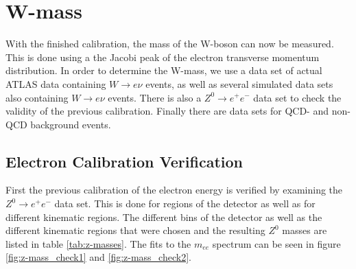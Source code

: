 \section{W-mass}
\label{sec:w-mass}
With the finished calibration, the mass of the W-boson can now be measured. This is done using a the Jacobi peak of the electron transverse momentum distribution.
In order to determine the W-mass, we use a data set of actual ATLAS data containing $W \rightarrow e\nu$ events,
as well as several simulated data sets also containing $W \rightarrow e\nu$ events. 
There is also a $Z^0 \rightarrow e^+e^-$ data set to check the validity of the previous calibration.
Finally there are data sets for QCD- and non-QCD background events.

\subsection{Electron Calibration Verification}
    \label{sec:calibration_verification}
    First the previous calibration of the electron energy is verified by examining the $Z^0 \rightarrow e^+e^-$ data set.
    This is done for regions of the detector as well as for different kinematic regions. The different bins of the detector as well as the different kinematic regions
    that were chosen and the resulting $Z^0$ masses are listed in table \ref{tab:z-masses}. The fits to the $m_{ee}$ spectrum can be seen in figure \ref{fig:z-mass_check1} and \ref{fig:z-mass_check2}.


